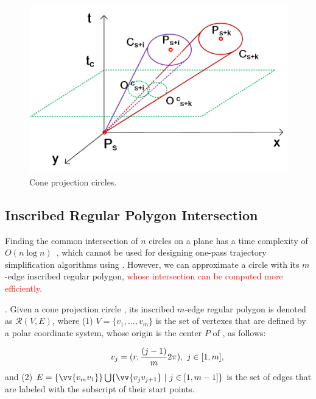 \begin{figure}[tb!]
	\centering
	\includegraphics[scale=0.7]{figures/Fig-project-circle.png}
	\caption{\small Cone projection circles.}
	\vspace{-1ex}
	\label{fig:pcircle}
\end{figure}


\subsection{Inscribed Regular Polygon Intersection}
\label{subsec-RPI}

Finding the common intersection of $n$ circles on a plane has a time complexity of ${O(n\log n)}$~\cite{Shamos:Circle}, which cannot be used for designing one-pass trajectory simplification algorithms using \sed.
%
However, we can approximate a circle with its $m$-edge inscribed regular polygon, \textcolor{red}{whose intersection can be computed more efficiently}.




.
Given a cone projection circle , its inscribed $m$-edge regular polygon is denoted as $\mathcal{R}(V, E)$,
where (1) $V=\{v_1, \ldots, v_{m}\}$ is the set of vertexes that are defined by a polar coordinate system, whose origin is the center $P$ of \pcircle{}, as follows:


\vspace{-2ex}
\begin{equation*}
\label{equ-regular-polygon}
    \begin{aligned}
        \hspace{5ex}  v_j = (r, \frac{(j-1)}{m}2\pi), ~j \in [1, m], \\
    \end{aligned}
\end{equation*}
%
\ni and (2) $E= \{\vv{v_mv_1}\} \bigcup \{\vv{v_jv_{j+1}}\ |\ j\in [1, m-1]\}$ is the set of edges that are labeled with the subscript of their start points.

